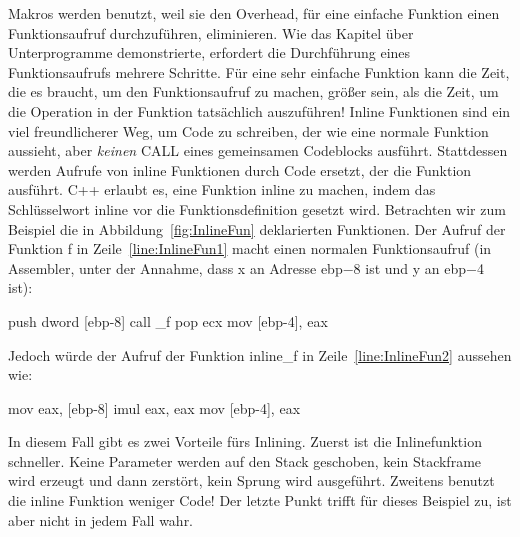 Makros werden benutzt, weil sie den Overhead, f\"{u}r eine einfache
Funktion einen Funktionsaufruf durchzuf\"{u}hren, eliminieren. Wie das
Kapitel \"{u}ber Unterprogramme demonstrierte, erfordert die
Durchf\"{u}hrung eines Funktionsaufrufs mehrere Schritte. F\"{u}r eine sehr
einfache Funktion kann die Zeit, die es braucht, um den
Funktionsaufruf zu machen, gr\"{o}{\ss}er sein, als die Zeit, um die
Operation in der Funktion tats\"{a}chlich auszuf\"{u}hren! Inline Funktionen
sind ein viel freundlicherer Weg, um Code zu schreiben, der wie eine
normale Funktion aussieht, aber \emph{keinen} {\code CALL} eines
gemeinsamen Codeblocks ausf\"{u}hrt. Stattdessen werden Aufrufe von
inline Funktionen durch Code ersetzt, der die Funktion ausf\"{u}hrt. C++
erlaubt es, eine Funktion inline zu machen, indem das Schl\"{u}sselwort
{\code inline} vor die Funktionsdefinition gesetzt wird. Betrachten
wir zum Beispiel die in Abbildung~\ref{fig:InlineFun} deklarierten
Funktionen. Der Aufruf der Funktion {\code f} in
Zeile~\ref{line:InlineFun1} macht einen normalen Funktionsaufruf (in
Assembler, unter der Annahme, dass {\code x} an Adresse {\code
ebp$-$8} ist und {\code y} an {\code ebp$-$4} ist):\pagebreak %
\begin{AsmCodeListing}[numbers=left]
     push   dword [ebp-8]
     call   _f
     pop    ecx
     mov    [ebp-4], eax
\end{AsmCodeListing}
Jedoch w\"{u}rde der Aufruf der Funktion {\code inline\_f} in
Zeile~\ref{line:InlineFun2} aussehen wie:
\begin{AsmCodeListing}[firstnumber=last]
     mov    eax, [ebp-8]
     imul   eax, eax
     mov    [ebp-4], eax
\end{AsmCodeListing}

In diesem Fall gibt es zwei Vorteile f\"{u}rs Inlining. Zuerst ist die
Inlinefunktion schneller. Keine Parameter werden auf den Stack
geschoben, kein Stackframe  wird erzeugt und dann
zerst\"{o}rt, kein Sprung wird ausgef\"{u}hrt. Zweitens benutzt die inline
Funktion weniger Code! Der letzte Punkt trifft f\"{u}r dieses Beispiel
zu, ist aber nicht in jedem Fall wahr.

